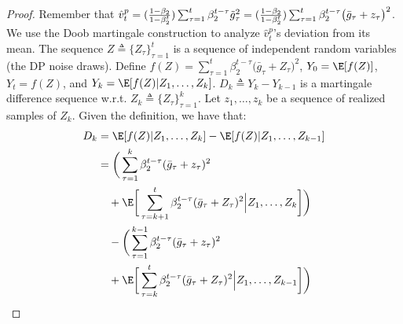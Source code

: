 \documentclass[letterpaper]{article} %
\def\V{\mathbb{V}}
\begin{document}
\begin{proof}
Remember that $\hat{v}_t^{p} = (\frac{1-\beta_2}{1-\beta_2^t})\sum_{\tau=1}^{t} \beta_{2}^{t-\tau} {\Tilde{g}_\tau}^{2} = (\frac{1-\beta_2}{1-\beta_2^t})\sum_{\tau=1}^{t} \beta_{2}^{t-\tau} \big(\bar{g}_\tau + z_\tau\big)^{2}$.
We use the Doob martingale construction to analyze $\hat{v}_t^{p}$'s deviation from its mean. The sequence $Z \triangleq \{Z_\tau\}_{\tau=1}^t$ is a sequence of independent random variables (the DP noise draws). Define $f(Z) = \sum_{\tau=1}^{t} \beta_{2}^{t-\tau} \big(\bar{g}_\tau + Z_\tau\big)^{2}$,
$Y_0 = \E[f(Z)]$, $Y_t = f(Z)$, and
$Y_k = \E[f(Z) | Z_1, \ldots, Z_k]$. $D_k \triangleq Y_k - Y_{k-1}$ is a martingale difference sequence w.r.t.
$Z_k \triangleq \{Z_\tau\}_{\tau=1}^k$. Let $z_1, \ldots, z_{k}$ be a sequence of realized samples of $Z_{k}$.
Given the definition, we have that:
\begin{align*}
D_k &= \E[f(Z) | Z_1, \ldots, Z_k] - \E[f(Z) | Z_1, \ldots, Z_{k-1}] \\
    &= \bigg(\sum_{\tau=1}^{k} \beta_2^{t-\tau}(\Bar{g}_\tau + z_\tau)^2 \\ & \ \ \ + \E\bigg[\sum_{\tau=k+1}^{t} \beta_2^{t-\tau}(\Bar{g}_\tau + Z_\tau)^2 \Big\vert Z_1, \ldots, Z_k \bigg] \bigg) \\
    & \ \ \ - \bigg(\sum_{\tau=1}^{k-1} \beta_2^{t-\tau}(\Bar{g}_\tau + z_\tau)^2 \\ & \ \ \ + \E\bigg[\sum_{\tau=k}^{t} \beta_2^{t-\tau}(\Bar{g}_\tau + Z_\tau)^2 \Big\vert Z_1, \ldots, Z_{k-1} \bigg] \bigg) \\

\end{align*}
\end{proof}
\end{document}
